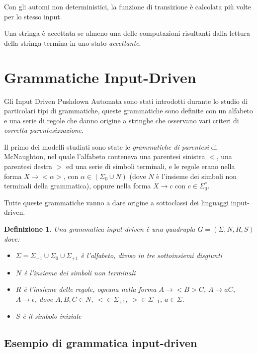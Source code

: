 \documentclass[a4paper,12pt]{report}
\newtheorem{definition}{Definizione}[chapter]
\begin{document}
    Con gli automi non deterministici, la funzione di transizione è calcolata più volte per lo stesso input. 
    
    Una stringa è accettata se almeno una delle computazioni risultanti dalla lettura della stringa termina in uno stato \textit{accettante}.

    \section{Grammatiche Input-Driven}

    Gli Input Driven Pushdown Automata sono stati introdotti durante lo studio di particolari tipi di grammatiche, queste grammatiche sono definite
    con un alfabeto e una serie di regole che danno origine a stringhe che osservano vari criteri di \textit{corretta parentesizzazione}.
    
    Il primo dei modelli studiati sono state le \textit{grammatiche di parentesi} di McNaughton, nel quale l'alfabeto conteneva una parentesi sinistra $<$, una parentesi destra $>$
    ed una serie di simboli terminali, e le regole erano nella forma $X \rightarrow <\alpha>$, con $\alpha \in (\Sigma_0 \cup N)$ (dove $N$ è l'insieme dei simboli non terminali della grammatica), oppure nella forma $X \rightarrow c$ con $c \in \Sigma_0^*$.
    
    Tutte queste grammatiche vanno a dare origine a sottoclassi dei linguaggi input-driven.

    \begin{definition}
        Una grammatica input-driven è una quadrupla $G = (\Sigma, N, R, S)$ dove:
        \begin{itemize}
            \item $\Sigma = \Sigma_{-1} \cup \Sigma_0 \cup \Sigma_{+1}$ è l'alfabeto, diviso in tre sottoinsiemi disgiunti
            \item $N$ è l'insieme dei simboli non terminali
            \item $R$ è l'insieme delle regole, ognuna nella forma $A \rightarrow <B>C$, $A \rightarrow aC$, $A \rightarrow \epsilon$, dove $A, B, C \in N$, $< \in \Sigma_{+1}$, $> \in \Sigma_{-1}$, $a \in \Sigma$.
            \item $S$ è il simbolo iniziale
        \end{itemize}
    \end{definition}

    \subsection{Esempio di grammatica input-driven}
    
\end{document}

